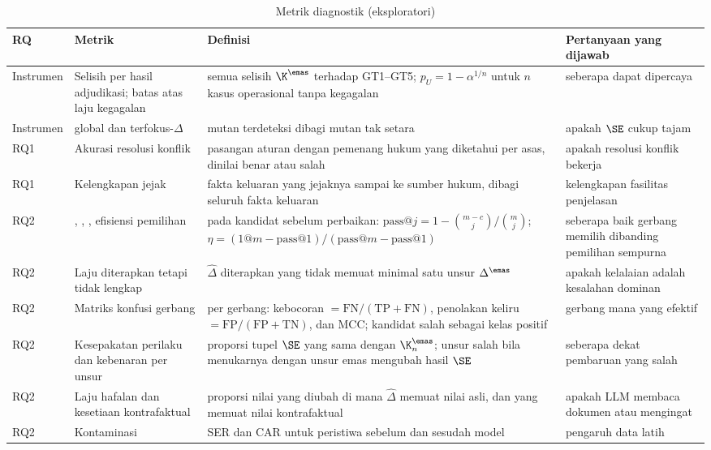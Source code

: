 \begin{table}[t]
\centering
\caption{Metrik diagnostik (eksploratori)}
\label{tab:diagnostik}
\scriptsize
\begin{tabularx}{\textwidth}{@{}P{1.2cm} P{3.3cm} L P{3.6cm}@{}}
\toprule
\textbf{RQ} & \textbf{Metrik} & \textbf{Definisi} & \textbf{Pertanyaan yang dijawab} \\
\midrule
Instrumen & Selisih per hasil adjudikasi; batas atas laju kegagalan & semua selisih $\K^{\emas}$ terhadap GT1--GT5; $p_U = 1-\alpha^{1/n}$ untuk $n$ kasus operasional tanpa kegagalan & seberapa dapat dipercaya  \\
Instrumen &  global dan terfokus-$\Delta$ & mutan terdeteksi dibagi mutan tak setara & apakah $\SE$ cukup tajam \\
RQ1 & Akurasi resolusi konflik & pasangan aturan dengan pemenang hukum yang diketahui per asas, dinilai benar atau salah & apakah resolusi konflik bekerja \\
RQ1 & Kelengkapan jejak & fakta keluaran yang jejaknya sampai ke sumber hukum, dibagi seluruh fakta keluaran & kelengkapan fasilitas penjelasan \\
\midrule
RQ2 & , , , efisiensi pemilihan & pada kandidat sebelum perbaikan: $\text{pass@}j = 1-\binom{m-c}{j}/\binom{m}{j}$; $\eta = (\text{1@}m - \text{pass@}1)/(\text{pass@}m - \text{pass@}1)$ & seberapa baik gerbang memilih dibanding pemilihan sempurna \\
RQ2 & Laju diterapkan tetapi tidak lengkap & $\hat{\Delta}$ diterapkan yang tidak memuat minimal satu unsur $\Delta^{\emas}$ & apakah kelalaian adalah kesalahan dominan \\
RQ2 & Matriks konfusi gerbang & per gerbang: kebocoran $=\mathrm{FN}/(\mathrm{TP}+\mathrm{FN})$, penolakan keliru $=\mathrm{FP}/(\mathrm{FP}+\mathrm{TN})$, dan MCC; kandidat salah sebagai kelas positif & gerbang mana yang efektif \\
RQ2 & Kesepakatan perilaku dan kebenaran per unsur & proporsi tupel $\SE$ yang sama dengan $\K^{\emas}_n$; unsur salah bila menukarnya dengan unsur emas mengubah hasil $\SE$ & seberapa dekat pembaruan yang salah \\
RQ2 & Laju hafalan dan kesetiaan kontrafaktual & proporsi nilai yang diubah di mana $\hat{\Delta}$ memuat nilai asli, dan yang memuat nilai kontrafaktual & apakah LLM membaca dokumen atau mengingat \\
RQ2 & Kontaminasi & SER dan CAR untuk peristiwa sebelum dan sesudah  model & pengaruh data latih \\

\end{tabularx}
\end{table}

